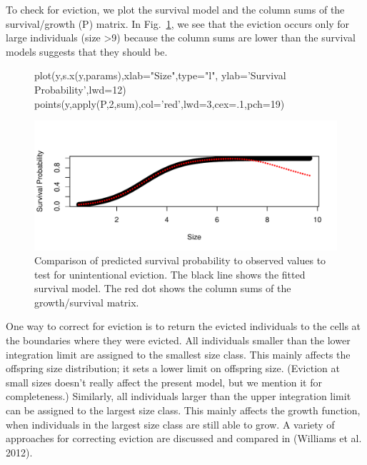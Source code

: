 \documentclass[11pt]{article}
\begin{document}
To check for eviction, we plot the survival model and the column sums of the survival/growth (P) matrix. In Fig.~\ref{fig:fig_eviction}, we see that the eviction occurs only for large individuals (size >9) because the column sums are lower than the survival models suggests that they should be.

\begin{figure}[H]
\begin{center}
\begin{Schunk}
\begin{Sinput}
     plot(y,s.x(y,params),xlab="Size",type="l",
        ylab='Survival Probability',lwd=12)
     points(y,apply(P,2,sum),col='red',lwd=3,cex=.1,pch=19) 
\end{Sinput}
\end{Schunk}
\includegraphics{IPM_Guide_Appendix_A-fig_eviction}
\caption{Comparison of predicted survival probability to observed values to test for unintentional eviction. The black line shows the fitted survival model. The red dot shows the column sums of the growth/survival matrix.}
\label{fig:fig_eviction}
\end{center}
\end{figure}

One way to correct for eviction is to return the evicted individuals to the cells at the boundaries where they were evicted. All individuals smaller than the lower integration limit are assigned to the smallest size class. This mainly affects the offspring size distribution; it sets a lower limit on offspring size. (Eviction at small sizes doesn't really affect the present model, but we mention it for completeness.) Similarly, all individuals larger than the upper integration limit can be assigned to the largest size class. This mainly affects the growth function, when individuals in the largest size class are still able to grow. A variety of approaches for correcting eviction are discussed and compared in (Williams et al. 2012).
\end{document}
